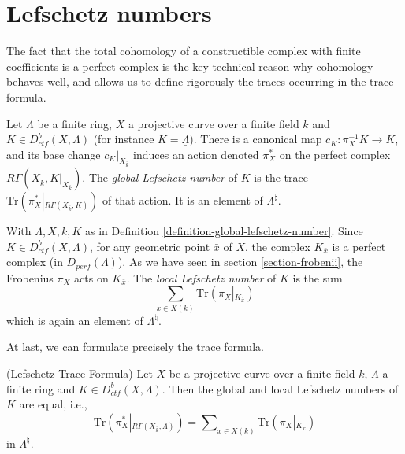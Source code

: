 \section{Lefschetz numbers}
\label{section-lefschetz-numbers}

\noindent
The fact that the total cohomology of a constructible complex with finite
coefficients is a perfect complex is the key technical reason why cohomology
behaves well, and allows us to define rigorously the traces occurring in the
trace formula.

\begin{definition}
\label{definition-global-lefschetz-number}
Let $\Lambda$ be a finite ring, $X$ a projective curve over a finite field $k$
and $K \in D_{ctf}^b(X, \Lambda)$ (for instance $K = \underline\Lambda$).
There is a canonical map $c_K : \pi_X^{-1}K \to K$, and its base change
$c_K|_{X_{\bar k}}$ induces an action denoted $\pi_X^*$ on the perfect
complex $R\Gamma(X_{\bar k}, K|_{X_{\bar k}})$. The
{\it global Lefschetz number} of $K$ is the trace $
\text{Tr}(\pi_X^*\left|_{R\Gamma(X_{\bar k}, K)}\right.)$ of that action.
It is an element of $\Lambda^\natural$.
\end{definition}

\begin{definition}
\label{definition-local-lefschetz-number}
With $\Lambda, X, k, K$ as in
Definition \ref{definition-global-lefschetz-number}.
Since $K\in D_{ctf}^b (X, \Lambda)$, for any geometric point $\bar x$ of $X$,
the complex $K_{\bar x}$ is a perfect complex (in $D_{perf}(\Lambda)$). As we
have seen in section \ref{section-frobenii}, the Frobenius $\pi_X$ acts on
$K_{\bar x}$. The {\it local Lefschetz number} of $K$ is the sum
$$
\sum_{x\in X(k)} \text{Tr}(\pi_X \left|_{K_{\overline x}}\right.)
$$
which is again an element of $\Lambda^\natural$.
\end{definition}

\noindent
At last, we can formulate precisely the trace formula.

\begin{theorem}
\label{theorem-trace}
(Lefschetz Trace Formula)
Let $X$ be a projective curve over a finite field $k$, $\Lambda$ a finite ring
and $K \in D_{ctf}^b(X,\Lambda)$. Then the global and local Lefschetz numbers
of $K$ are equal, i.e.,
\begin{equation}
\label{equation-trace-formula}
\text{Tr}(\pi^*_X\left|_{R\Gamma(X_{\bar k}, \Lambda)}\right.)
=
\sum\nolimits_{x\in X(k)} \text{Tr}(\pi_X\left|_{K_{\bar x}}\right.)
\end{equation}
in $\Lambda^\natural$.
\end{theorem}

